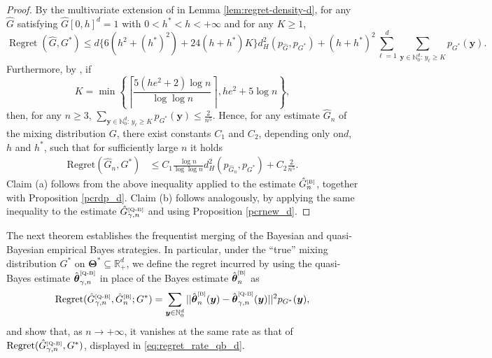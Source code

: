 \documentclass[twoside,12pt]{article}
\begin{document}
\begin{proof} By the multivariate extension of \citet[Lemma 4]{Jan(24)} in Lemma \ref{lem:regret-density-d}, for any $\hat G$ satisfying   $\hat G[0,h]^d=1$ with $0<h^\ast<h<+\infty$ and for any $K\geq 1$,
\[
\operatorname{Regret}(\widehat G,G^\ast)
\leq
d\Big\{
6(h^2+(h^\ast)^2)+24(h+h^\ast)K
\Big\}
d_H^2(p_{\widehat G},p_{G^\ast})
+
(h+h^\ast)^2
\sum_{\ell=1}^d
\sum_{\boldsymbol y\in\mathbb N_0^d:\,y_\ell\geq K}
p_{G^\ast}(\boldsymbol y).
\]
Furthermore, by \citet[Lemma 11]{Jan(24)}, if 
$$
K=\min\left\{\left\lceil \frac{5(he^2+2)\log n}{\log\log n}\right\rceil,he^2+5\log n\right\},
$$
then, for any $n\geq 3$,  $\sum_{\boldsymbol y\in\mathbb N_0^d:\,y_\ell\geq K}
p_{G^\ast}(\boldsymbol y)\leq \frac{2}{n^5}$. Hence, for any estimate $\hat G_n$ of the mixing distribution $G$,  there exist constants $C_1$ and $C_2$, depending only on$d$,  $h$ and $h^\ast$, such that for sufficiently large $n$ it holds
\begin{align*}
  \text{Regret}(\hat G_n,G^\ast)&\leq C_1\frac{\log n}{\log\log n} d_H^2(p_{\hat G_n},p_{G^*})+C_2\frac{2}{n^5}.
\end{align*}
Claim (a) follows from the above inequality applied to the estimate
$\hat G_n^{\text{\tiny{[B]}}}$, together with Proposition
\ref{pcrdp_d}. Claim (b) follows analogously, by applying the same
inequality to the estimate $\hat G_{\gamma,n}^{\text{\tiny{[Q-B]}}}$ and using
Proposition \ref{pcrnew_d}.
\end{proof}

The next theorem establishes the frequentist merging of the Bayesian and quasi-Bayesian empirical Bayes strategies. In particular, under the ``true'' mixing distribution $G^{\ast}$ on $\boldsymbol{\Theta}^{\ast}\subseteq\mathbb R_+^d$, we define the regret incurred by using the quasi-Bayes estimate $\hat{\boldsymbol\theta}^{\text{\tiny{[Q-B]}}}_{\gamma,n}$ in place of  the Bayes estimate $\hat{\boldsymbol\theta}^{\text{\tiny{[B]}}}_{n}$ as
\begin{equation}\label{merging_regret_d}
\text{Regret}(\hat G_{\gamma,n}^{\text{\tiny{[Q-B]}}},\hat G_{n}^{\text{\tiny{[B]}}};G^{\ast})=\sum_{\boldsymbol y\in\mathbb N_0^d} ||\hat{\boldsymbol \theta}_{n}^{\text{\tiny{[B]}}}(\boldsymbol y)-\hat{\boldsymbol \theta}_{\gamma,n}^{\text{\tiny{[Q-B]}}}(\boldsymbol y)||^2p_{G^*}(\boldsymbol y),
\end{equation}
and show that, as $n\rightarrow+\infty$, it vanishes at the same rate as that of $\text{Regret}(\hat G_{\gamma,n}^{\text{\tiny{[Q-B]}}},G^{\ast})$, displayed in \eqref{eq:regret_rate_qb_d}.
\end{document}

